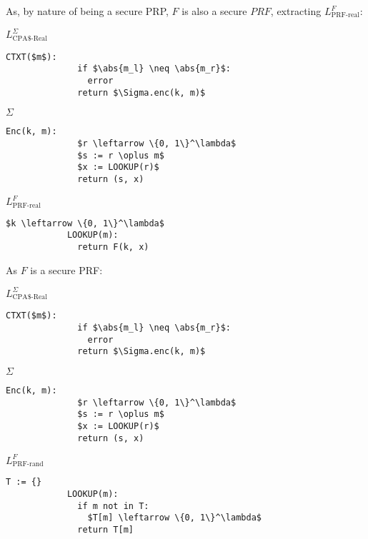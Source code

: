 \documentclass[a4paper]{scrreprt}
\DeclarePairedDelimiter\abs{\lvert}{\rvert}
\begin{document}
As, by nature of being a secure PRP, $F$ is also a secure $PRF$, extracting
$L^{F}_{\text{PRF-real}}$:

\begin{tcbraster}[raster columns=3,raster equal height,nobeforeafter,raster column skip=0.2cm]
	\begin{library}{$L^{\Sigma}_{\text{CPA\$-Real}}$}
		\begin{lstlisting}[mathescape=true,autogobble=true]
			CTXT($m$):
			  if $\abs{m_l} \neq \abs{m_r}$:
			    error
			  return $\Sigma.enc(k, m)$
		\end{lstlisting}
	\end{library}
	\begin{library}{$\Sigma$}
		\begin{lstlisting}[mathescape=true,autogobble=true]
			Enc(k, m):
			  $r \leftarrow \{0, 1\}^\lambda$
			  $s := r \oplus m$
			  $x := LOOKUP(r)$
			  return (s, x)
		\end{lstlisting}
	\end{library}
	\begin{library}{$L^{F}_{\text{PRF-real}}$}
		\begin{lstlisting}[mathescape=true,autogobble=true]
			$k \leftarrow \{0, 1\}^\lambda$
			LOOKUP(m):
			  return F(k, x)
		\end{lstlisting}
	\end{library}
\end{tcbraster}

As $F$ is a secure PRF:

\begin{tcbraster}[raster columns=3,raster equal height,nobeforeafter,raster column skip=0.2cm]
	\begin{library}{$L^{\Sigma}_{\text{CPA\$-Real}}$}
		\begin{lstlisting}[mathescape=true,autogobble=true]
			CTXT($m$):
			  if $\abs{m_l} \neq \abs{m_r}$:
			    error
			  return $\Sigma.enc(k, m)$
		\end{lstlisting}
	\end{library}
	\begin{library}{$\Sigma$}
		\begin{lstlisting}[mathescape=true,autogobble=true]
			Enc(k, m):
			  $r \leftarrow \{0, 1\}^\lambda$
			  $s := r \oplus m$
			  $x := LOOKUP(r)$
			  return (s, x)
		\end{lstlisting}
	\end{library}
	\begin{library}{$L^{F}_{\text{PRF-rand}}$}
		\begin{lstlisting}[mathescape=true,autogobble=true]
			T := {}
			LOOKUP(m):
			  if m not in T:
			    $T[m] \leftarrow \{0, 1\}^\lambda$
			  return T[m]
		\end{lstlisting}
	\end{library}
\end{tcbraster}
\end{document}
